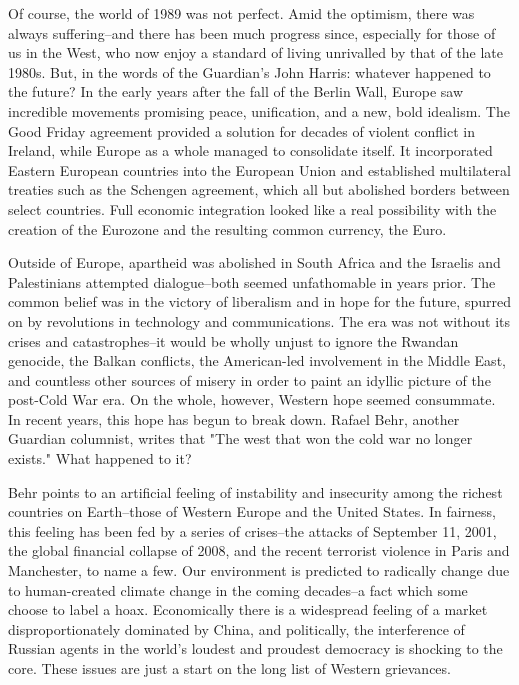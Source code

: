    Of course, the world of 1989 was not perfect. Amid the optimism, there
   was always suffering--and there has been much progress since,
   especially for those of us in the West, who now enjoy a standard of
   living unrivalled by that of the late 1980s. But, in the words of the
   Guardian's John Harris: whatever happened to the future? In the early
   years after the fall of the Berlin Wall, Europe saw incredible
   movements promising peace, unification, and a new, bold idealism. The
   Good Friday agreement provided a solution for decades of violent
   conflict in Ireland, while Europe as a whole managed to consolidate
   itself. It incorporated Eastern European countries into the European
   Union and established multilateral treaties such as the Schengen
   agreement, which all but abolished borders between select countries.
   Full economic integration looked like a real possibility with the
   creation of the Eurozone and the resulting common currency, the Euro.

   Outside of Europe, apartheid was abolished in South Africa and the
   Israelis and Palestinians attempted dialogue--both seemed unfathomable
   in years prior. The common belief was in the victory of liberalism and
   in hope for the future, spurred on by revolutions in technology and
   communications. The era was not without its crises and catastrophes--it
   would be wholly unjust to ignore the Rwandan genocide, the Balkan
   conflicts, the American-led involvement in the Middle East, and
   countless other sources of misery in order to paint an idyllic picture
   of the post-Cold War era. On the whole, however, Western hope seemed
   consummate. In recent years, this hope has begun to break down. Rafael
   Behr, another Guardian columnist, writes that "The west that won the
   cold war no longer exists." What happened to it?

   Behr points to an artificial feeling of instability and insecurity
   among the richest countries on Earth--those of Western Europe and the
   United States. In fairness, this feeling has been fed by a series of
   crises--the attacks of September 11, 2001, the global financial
   collapse of 2008, and the recent terrorist violence in Paris and
   Manchester, to name a few. Our environment is predicted to radically
   change due to human-created climate change in the coming decades--a
   fact which some choose to label a hoax. Economically there is a
   widespread feeling of a market disproportionately dominated by China,
   and politically, the interference of Russian agents in the world's
   loudest and proudest democracy is shocking to the core. These issues
   are just a start on the long list of Western grievances.

